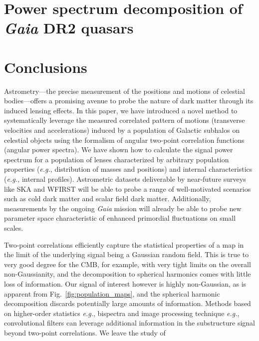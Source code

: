 \documentclass[prd,aps,10pt,nofootinbib,twocolumn,superscriptaddress,preprintnumbers,balancelastpage,longbibliography]{revtex4-1}
\newcommand{\Gaia}{\emph{Gaia}\xspace}
\begin{document}

\section{Power spectrum decomposition of \Gaia DR2 quasars}
\label{sec:gaia-quasars}

\section{Conclusions}
\label{sec:conclusions}

Astrometry---the precise measurement of the positions and motions of celestial bodies---offers a promising avenue to probe the nature of dark matter through its induced lensing effects. In this paper, we have introduced a novel method to systematically leverage the measured correlated pattern of motions (transverse velocities and accelerations) induced by a population of Galactic subhalos on celestial objects using the formalism of angular two-point correlation functions (angular power spectra). We have shown how to calculate the signal power spectrum for a population of lenses characterized by arbitrary population properties (\emph{e.g.}, distribution of masses and positions) and internal characteristics (\emph{e.g.,} internal profiles). Astrometric datasets deliverable by near-future surveys like SKA and WFIRST will be able to probe a range of well-motivated scenarios such as cold dark matter and scalar field dark matter. Additionally, measurements by the ongoing \emph{Gaia} mission will already be able to probe new parameter space characteristic of enhanced primordial fluctuations on small scales.

Two-point correlations efficiently capture the statistical properties of a map in the limit of the underlying signal being a Gaussian random field. This is true to very good degree for the CMB, for example, with very tight limits on the overall non-Gaussianity, and the decomposition to spherical harmonics comes with little loss of information. Our signal of interest however is highly non-Gaussian, as is apparent from Fig.~\ref{fig:population_maps}, and the spherical harmonic decomposition discards potentially large amounts of information. Methods based on higher-order statistics \emph{e.g.}, bispectra and image processing technique \emph{e.g.}, convolutional filters can leverage additional information in the substructure signal beyond two-point correlations. We leave the study of 
\end{document}
